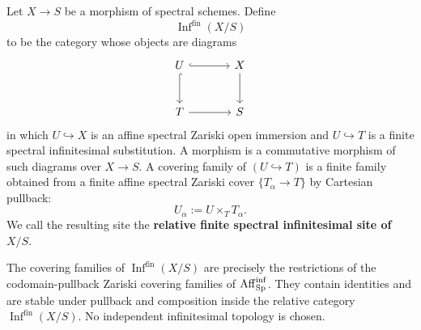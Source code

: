 \begin{definition}
\label{def:relative-spectral-infinitesimal-site}
Let \(X\to S\) be a morphism of spectral schemes. Define
\[
    \operatorname{Inf}^{\mathrm{fin}}(X/S)
\]
to be the category whose objects are diagrams
\[
\begin{tikzcd}[column sep=large,row sep=large]
    U \arrow[r,hook] \arrow[d,hook]
        & X \arrow[d]
    \\
    T \arrow[r]
        & S
\end{tikzcd}
\]
in which \(U\hookrightarrow X\) is an affine spectral Zariski open immersion
and \(U\hookrightarrow T\) is a finite spectral infinitesimal substitution.
A morphism is a commutative morphism of such diagrams over \(X\to S\).
A covering family of \((U\hookrightarrow T)\) is a finite family obtained from
a finite affine spectral Zariski cover \(\{T_\alpha\to T\}\) by Cartesian
pullback:
\[
    U_\alpha:=U\times_TT_\alpha.
\]
We call the resulting site the \textbf{relative finite spectral infinitesimal
site of \(X/S\)}.
\end{definition}

\begin{proposition}
\label{prop:relative-infinitesimal-site-inherited}
The covering families of
\(\operatorname{Inf}^{\mathrm{fin}}(X/S)\) are precisely the restrictions of
the codomain-pullback Zariski covering families of
\(\operatorname{Aff}_{\operatorname{Sp}}^{\inf}\). They contain identities and are stable under
pullback and composition inside the relative category
\(\operatorname{Inf}^{\mathrm{fin}}(X/S)\). No independent infinitesimal
topology is chosen.
\end{proposition}

